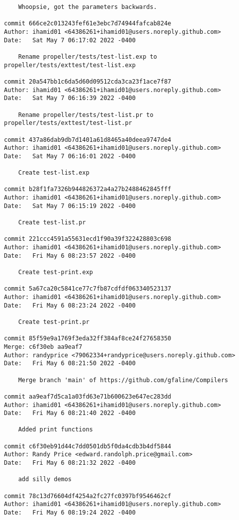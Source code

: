 {\begin{verbatim}
    Whoopsie, got the parameters backwards.

commit 666ce2c013243fef61e3ebc7d74944fafcab824e
Author: ihamid01 <64386261+ihamid01@users.noreply.github.com>
Date:   Sat May 7 06:17:02 2022 -0400

    Rename propeller/tests/test-list.exp to propeller/tests/exttest/test-list.exp

commit 20a547bb1c6da5d60d09512cda3ca23f1ace7f87
Author: ihamid01 <64386261+ihamid01@users.noreply.github.com>
Date:   Sat May 7 06:16:39 2022 -0400

    Rename propeller/tests/test-list.pr to propeller/tests/exttest/test-list.pr

commit 437a86dab9db7d1401a61d8465a40deea9747de4
Author: ihamid01 <64386261+ihamid01@users.noreply.github.com>
Date:   Sat May 7 06:16:01 2022 -0400

    Create test-list.exp

commit b28f1fa7326b944826372a4a27b2488462845fff
Author: ihamid01 <64386261+ihamid01@users.noreply.github.com>
Date:   Sat May 7 06:15:19 2022 -0400

    Create test-list.pr

commit 221ccc4591a55631ecd1f90a39f322428803c698
Author: ihamid01 <64386261+ihamid01@users.noreply.github.com>
Date:   Fri May 6 08:23:57 2022 -0400

    Create test-print.exp

commit 5a67ca20c5841ce77c7fb87cdfdf063340523137
Author: ihamid01 <64386261+ihamid01@users.noreply.github.com>
Date:   Fri May 6 08:23:24 2022 -0400

    Create test-print.pr

commit 85f59e9a1769f3eda32ff384af8ce24f27658350
Merge: c6f30eb aa9eaf7
Author: randyprice <79062334+randyprice@users.noreply.github.com>
Date:   Fri May 6 08:21:50 2022 -0400

    Merge branch 'main' of https://github.com/gfaline/Compilers

commit aa9eaf7d5ca1a03fd63e71b600623e647ec283dd
Author: ihamid01 <64386261+ihamid01@users.noreply.github.com>
Date:   Fri May 6 08:21:40 2022 -0400

    Added print functions

commit c6f30eb91d44c7dd0501db5f0da4cdb3b4df5844
Author: Randy Price <edward.randolph.price@gmail.com>
Date:   Fri May 6 08:21:32 2022 -0400

    add silly demos

commit 78c13d76604df4254a2fc27fc0397bf9546462cf
Author: ihamid01 <64386261+ihamid01@users.noreply.github.com>
Date:   Fri May 6 08:19:24 2022 -0400


\end{verbatim}}
